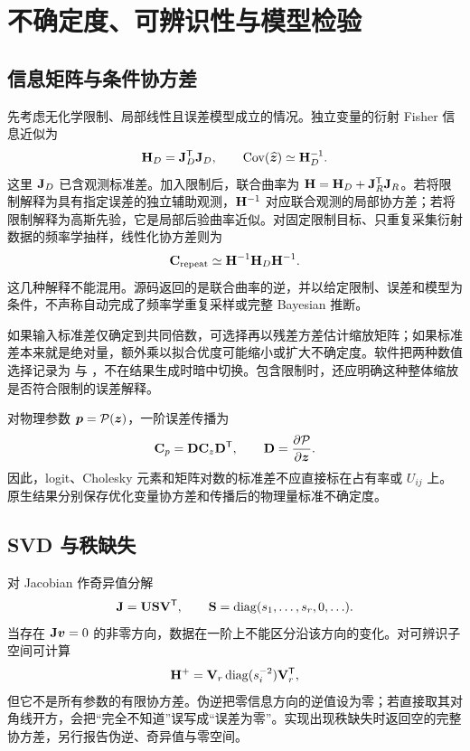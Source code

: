 \chapter{不确定度、可辨识性与模型检验}
\section{信息矩阵与条件协方差}
先考虑无化学限制、局部线性且误差模型成立的情况。独立变量的衍射 Fisher 信息近似为
\begin{equation}
\mathbf{H}_D=\mathbf{J}_D^{\mathsf T}\mathbf{J}_D,
\qquad \operatorname{Cov}(\widehat{\bm{z}})\simeq\mathbf{H}_D^{-1}.
\end{equation}
这里 $\mathbf{J}_D$ 已含观测标准差。加入限制后，联合曲率为 $\mathbf{H}=\mathbf{H}_D+\mathbf{J}_R^{\mathsf T}\mathbf{J}_R$。若将限制解释为具有指定误差的独立辅助观测，$\mathbf{H}^{-1}$ 对应联合观测的局部协方差；若将限制解释为高斯先验，它是局部后验曲率近似。对固定限制目标、只重复采集衍射数据的频率学抽样，线性化协方差则为
\begin{equation}
\mathbf{C}_{\mathrm{repeat}}\simeq\mathbf{H}^{-1}\mathbf{H}_D\mathbf{H}^{-1}.
\end{equation}
这几种解释不能混用。源码返回的是联合曲率的逆，并以给定限制、误差和模型为条件，不声称自动完成了频率学重复采样或完整 Bayesian 推断。

如果输入标准差仅确定到共同倍数，可选择再以残差方差估计缩放矩阵；如果标准差本来就是绝对量，额外乘以拟合优度可能缩小或扩大不确定度。软件把两种数值选择记录为  与 ，不在结果生成时暗中切换。包含限制时，还应明确这种整体缩放是否符合限制的误差解释。

对物理参数 $\bm{p}=\mathcal P(\bm{z})$，一阶误差传播为
\begin{equation}
\mathbf{C}_p=\mathbf{D}\mathbf{C}_z\mathbf{D}^{\mathsf T},\qquad
\mathbf{D}=\frac{\partial\mathcal P}{\partial\bm{z}}.
\end{equation}
因此，logit、Cholesky 元素和矩阵对数的标准差不应直接标在占有率或 $U_{ij}$ 上。原生结果分别保存优化变量协方差和传播后的物理量标准不确定度。

\section{SVD 与秩缺失}
对 Jacobian 作奇异值分解
\begin{equation}
\mathbf{J}=\mathbf{U}\mathbf{S}\mathbf{V}^{\mathsf T},\qquad
\mathbf{S}=\operatorname{diag}(s_1,\ldots,s_r,0,\ldots).
\end{equation}
当存在 $\mathbf{J}\bm{v}=0$ 的非零方向，数据在一阶上不能区分沿该方向的变化。对可辨识子空间可计算
\begin{equation}
\mathbf{H}^+=\mathbf{V}_r\operatorname{diag}(s_i^{-2})\mathbf{V}_r^{\mathsf T},
\end{equation}
但它不是所有参数的有限协方差。伪逆把零信息方向的逆值设为零；若直接取其对角线开方，会把“完全不知道”误写成“误差为零”。实现出现秩缺失时返回空的完整协方差，另行报告伪逆、奇异值与零空间。

